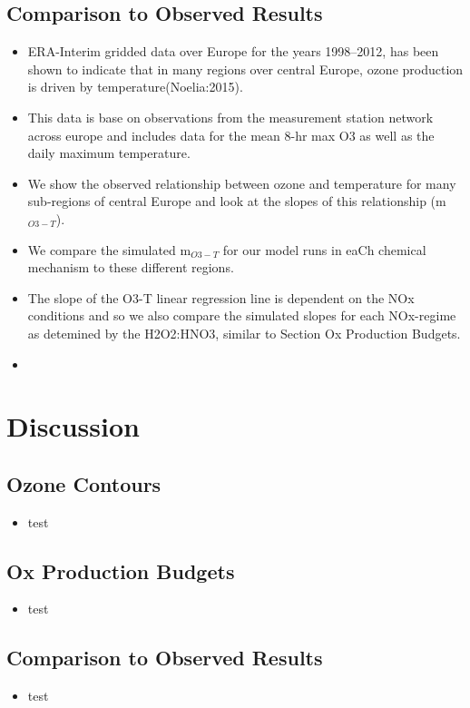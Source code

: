 \documentclass[11pt,a4paper]{article}
\begin{document}
\subsection{Comparison to Observed Results}
\begin{itemize}
    \item ERA-Interim gridded data over Europe for the years 1998--2012, has been shown to indicate that in many regions over central Europe, ozone production is driven by temperature(Noelia:2015).
    \item This data is base on observations from the measurement station network across europe and includes data for the mean 8-hr max O3 as well as the daily maximum temperature.
    \item We show the observed relationship between ozone and temperature for many sub-regions of central Europe and look at the slopes of this relationship (m$_{O3-T}$).
    \item We compare the simulated m$_{O3-T}$ for our model runs in eaCh chemical mechanism to these different regions.
    \item The slope of the O3-T linear regression line is dependent on the NOx conditions and so we also compare the simulated slopes for each NOx-regime as detemined by the H2O2:HNO3, similar to Section Ox Production Budgets.
    \item \color{red}{Missing results}
\end{itemize}

\section{Discussion} \label{s:discussion}
\subsection{Ozone Contours}
\begin{itemize}
    \item test
\end{itemize}

\subsection{Ox Production Budgets}
\begin{itemize}
    \item test
\end{itemize}

\subsection{Comparison to Observed Results}
\begin{itemize}
    \item test
\end{itemize}
\end{document}

